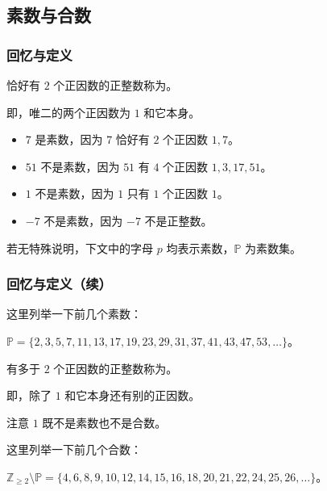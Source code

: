 \subsection{素数与合数}
\begin{frame}[c]
  \progressnow*
\end{frame}
\begin{frame}
  \frametitle{回忆与定义}
  \begin{definition}[素数]
    恰好有 $2$ 个正因数的正整数称为。
    
    即，唯二的两个正因数为 $1$ 和它本身。
  \end{definition}
  \pause
  \begin{examples}[素数]
    \begin{itemize}
      \item $7$ 是素数，因为 $7$ 恰好有 $2$ 个正因数 $1, 7$。
      \item $51$ 不是素数，因为 $51$ 有 $4$ 个正因数 $1, 3, 17, 51$。
      \item $1$ 不是素数，因为 $1$ 只有 $1$ 个正因数 $1$。
      \item $-7$ 不是素数，因为 $-7$ 不是正整数。
    \end{itemize}
  \end{examples}
  \pause
  若无特殊说明，下文中的字母 $p$ 均表示素数，$\mathbb P$ 为素数集。
\end{frame}
\begin{frame}
  \frametitle{回忆与定义（续）}
  这里列举一下前几个素数：
  \begin{center}
    $\mathbb P = \{ 2, 3, 5, 7, 11, 13, 17, 19, 23, 29, 31, 37, 41, 43, 47, 53, \ldots \}$。
  \end{center}
  \pause
  \begin{definition}[合数]
    有多于 $2$ 个正因数的正整数称为。
    
    即，除了 $1$ 和它本身还有别的正因数。
    
    注意 \alert{$1$ 既不是素数也不是合数}。
  \end{definition}
  \pause
  这里列举一下前几个合数：
  \begin{center}
    $\mathbb{Z}_{\ge 2} \setminus \mathbb{P} = \{ 4, 6, 8, 9, 10, 12, 14, 15, 16, 18, 20, 21, 22, 24, 25, 26, \ldots \}$。
  \end{center}
\end{frame}
